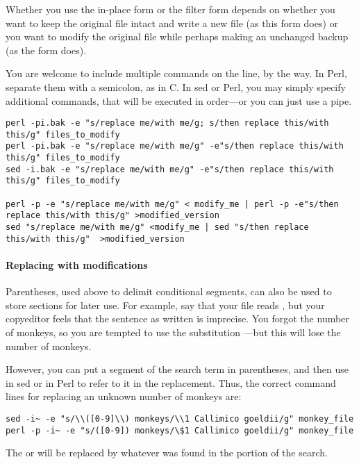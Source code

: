 Whether you use the in-place form or the filter form depends on whether
you want to keep the original file intact and write a new file (as this
form does) or you want to modify the original file while perhaps making
an unchanged backup (as the  form does).


You are welcome to include multiple commands on the line, by the way.
In Perl, separate them with a semicolon, as in C. In sed or Perl, you
may simply specify additional  commands, that will be executed in
order---or you can just use a pipe.
\begin{lstlisting}
perl -pi.bak -e "s/replace me/with me/g; s/then replace this/with this/g" files_to_modify
perl -pi.bak -e "s/replace me/with me/g" -e"s/then replace this/with this/g" files_to_modify
sed -i.bak -e "s/replace me/with me/g" -e"s/then replace this/with this/g" files_to_modify

perl -p -e "s/replace me/with me/g" < modify_me | perl -p -e"s/then replace this/with this/g" >modified_version
sed "s/replace me/with me/g" <modify_me | sed "s/then replace this/with this/g"  >modified_version
\end{lstlisting}

\paragraph{Replacing with modifications} Parentheses, used above to
delimit conditional segments, can also be used to store sections for
later use. For example, say that your file reads , but your copyeditor feels that the sentence as written is
imprecise. You forgot the number of monkeys, so you are tempted to use
the substitution ---but this will
lose the number of monkeys.

However, you can put a segment of the search term in parentheses, and
then use  in sed or  in Perl to refer to it in the replacement. Thus, the
correct command lines for replacing an unknown number of monkeys are:
\begin{lstlisting}
sed -i~ -e "s/\\([0-9]\\) monkeys/\\1 Callimico goeldii/g" monkey_file
perl -p -i~ -e "s/([0-9]) monkeys/\$1 Callimico goeldii/g" monkey_file
\end{lstlisting}
The  or  will be replaced by whatever was found in the
\ci{([0-9])} portion of the search.

